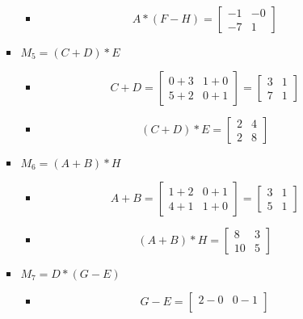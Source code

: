 \documentclass{article}
\begin{document}
\begin{itemize}
\begin{itemize}
\begin{itemize}
\begin{itemize}
\[						\]
						\item
						\[
						A * (F - H) = 
						\begin{bmatrix}
						-1 & -0 \\
						-7 & 1
						\end{bmatrix}
						\]
					\end{itemize}
				\item $M_5 = (C + D) * E$
					\begin{itemize}
						\item 
						\[
						C + D = 
						\begin{bmatrix}
						0 + 3 & 1 + 0 \\
						5 + 2 & 0 + 1
						\end{bmatrix}
						= 
						\begin{bmatrix}
						3 & 1 \\
						7 & 1
						\end{bmatrix}
						\]
						\item
						\[
						(C + D) * E = 
						\begin{bmatrix}
						2 & 4 \\
						2 & 8
						\end{bmatrix}
						\]
					\end{itemize}
				\item $M_6 = (A + B) * H$
					\begin{itemize}
						\item 
						\[
						A + B = 
						\begin{bmatrix}
						1 + 2 & 0 + 1 \\
						4 + 1 & 1 + 0
						\end{bmatrix}
						= 
						\begin{bmatrix}
						3 & 1 \\
						5 & 1
						\end{bmatrix}
						\]
						\item
						\[
						(A + B) * H = 
						\begin{bmatrix}
						8 & 3 \\
						10 & 5
						\end{bmatrix}
						\]
					\end{itemize}
				\item $M_7 = D * (G - E)$ 
					\begin{itemize}
						\item 
						\[
						G - E = 
						\begin{bmatrix}
						2 - 0 & 0 - 1 \\

\end{bmatrix}\]
\end{itemize}
\end{itemize}
\end{itemize}
\end{itemize}
\end{document}
